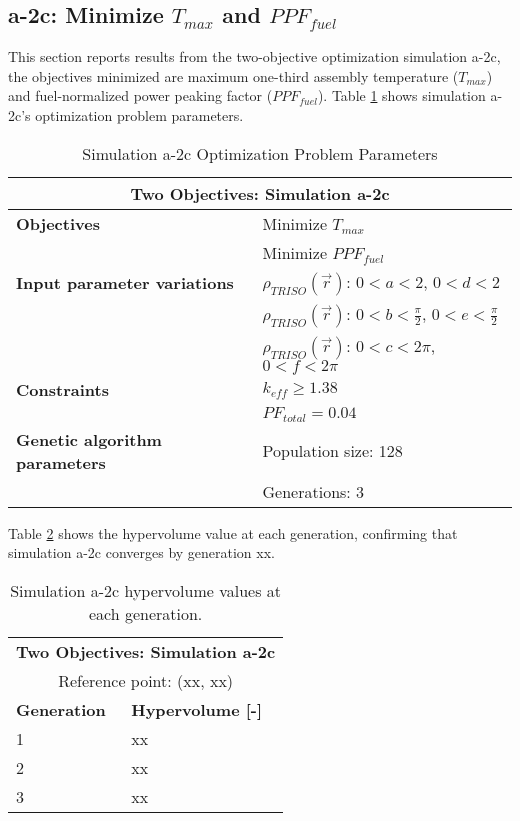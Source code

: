 \subsection{a-2c: Minimize $T_{max}$ and $PPF_{fuel}$}
\label{sec:a-2c}
This section reports results from the two-objective optimization simulation a-2c, the 
objectives minimized are maximum one-third assembly temperature ($T_{max}$) and 
fuel-normalized power peaking factor ($PPF_{fuel}$).  
Table \ref{tab:simulationa2c} shows simulation a-2c's optimization problem parameters. 
\begin{table}[htbp!]
    \centering
    \onehalfspacing
    \caption{Simulation a-2c Optimization Problem Parameters}
	\label{tab:simulationa2c}
    \footnotesize
    \begin{tabular}{l|p{5.3cm}}
    \hline 
    \multicolumn{2}{c}{\textbf{Two Objectives: Simulation a-2c}} \\
    \hline 
    \textbf{Objectives} & Minimize $T_{max}$ \\
    & Minimize $PPF_{fuel}$ \\
    \hline 
    \textbf{Input parameter variations}
    & $\rho_{TRISO}(\vec{r})$: $0<a<2$, $0<d<2$\\
    & $\rho_{TRISO}(\vec{r})$: $0<b<\frac{\pi}{2}$, $0<e<\frac{\pi}{2}$\\
    & $\rho_{TRISO}(\vec{r})$: $0<c<2\pi$, $0<f<2\pi$\\
    \hline
    \textbf{Constraints} & $k_{eff} \geq 1.38$\\ 
    & $PF_{total} = 0.04$\\
    \hline 
    \textbf{Genetic algorithm parameters} & Population size: 128 \\
    & Generations: 3 \\
    \hline
    \end{tabular}
\end{table}

Table \ref{tab:a2c-hypervolume} shows the hypervolume value at each generation, 
confirming that simulation a-2c converges by generation xx. 
\begin{table}[htbp!]
    \centering
    \onehalfspacing
    \caption{Simulation a-2c hypervolume values at each generation.}
	\label{tab:a2c-hypervolume}
    \footnotesize
    \begin{tabular}{ll}
    \hline 
    \multicolumn{2}{c}{\textbf{Two Objectives: Simulation a-2c}} \\
    \multicolumn{2}{c}{Reference point: (xx, xx)} \\
    \hline 
    \textbf{Generation} & \textbf{Hypervolume [-]} \\
    \hline
    1 & xx \\
    2 & xx \\
    3 & xx \\
    \hline
    \end{tabular}
\end{table}

